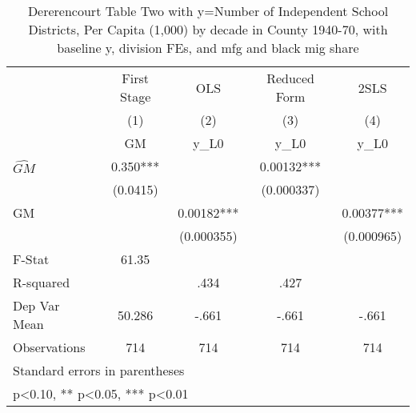 \begin{table}[htbp]\centering
\def\sym#1{\ifmmode^{#1}\else\(^{#1}\)\fi}
\caption{Dererencourt Table Two with y=Number of Independent School Districts, Per Capita (1,000) by decade in County 1940-70, with baseline y, division FEs, and mfg and black mig share}
\begin{tabular}{l*{4}{c}}
\toprule
                    & First Stage   &         OLS   &Reduced Form   &        2SLS   \\
                    &\multicolumn{1}{c}{(1)}&\multicolumn{1}{c}{(2)}&\multicolumn{1}{c}{(3)}&\multicolumn{1}{c}{(4)}\\
                    &\multicolumn{1}{c}{GM}&\multicolumn{1}{c}{y\_L0}&\multicolumn{1}{c}{y\_L0}&\multicolumn{1}{c}{y\_L0}\\
\midrule
$\hat{GM}$          &       0.350***&               &     0.00132***&               \\
                    &    (0.0415)   &               &  (0.000337)   &               \\
\addlinespace
GM                  &               &     0.00182***&               &     0.00377***\\
                    &               &  (0.000355)   &               &  (0.000965)   \\
\midrule
F-Stat              &       61.35   &               &               &               \\
R-squared           &               &        .434   &        .427   &               \\
Dep Var Mean        &      50.286   &       -.661   &       -.661   &       -.661   \\
Observations        &         714   &         714   &         714   &         714   \\
\bottomrule
\multicolumn{5}{l}{\footnotesize Standard errors in parentheses}\\
\multicolumn{5}{l}{\footnotesize * p<0.10, ** p<0.05, *** p<0.01}\\
\end{tabular}
\end{table}
